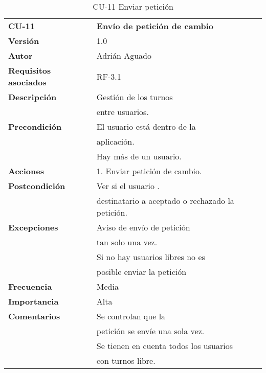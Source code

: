 \begin{table}
\begin{tabular}{llr}  
\toprule
\begin{minipage}[b]{0.24\columnwidth}\raggedright\strut
\textbf{CU-11}\strut
\end{minipage} & \begin{minipage}[b]{0.72\columnwidth}\raggedright\strut
\textbf{Envío de petición de cambio}\strut
\end{minipage}\tabularnewline
\cmidrule(r){1-2}
\textbf{Versión}       & 1.0           \\
\textbf{Autor}       & Adrián  Aguado    \\
\textbf{Requisitos asociados}       & RF-3.1 \\
\textbf{Descripción} & Gestión de los turnos \\
& entre usuarios. \\
\textbf{Precondición}  & El usuario está dentro de la \\
& aplicación.      \\
& Hay más de un usuario. \\
\textbf{Acciones} & 1. Enviar petición de cambio. \\
\textbf{Postcondición} & Ver si el usuario . \\
 & destinatario a aceptado o rechazado la petición. \\
\textbf{Excepciones} &   Aviso de envío de petición  \\
 &  tan solo una vez. \\
 &  Si no hay usuarios libres no es  \\
  &  posible enviar la petición  \\
\textbf{Frecuencia} & Media          \\
\textbf{Importancia} & Alta            \\
\textbf{Comentarios } & Se controlan que la       \\
& petición se envíe una sola vez. \\
& Se tienen en cuenta todos los usuarios      \\
& con turnos libre. \\
\bottomrule
\end{tabular}
\caption{CU-11 Enviar petición} 
\end{table}

